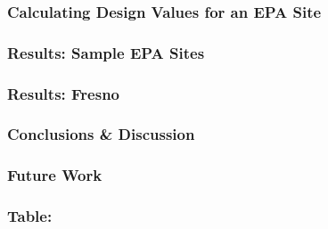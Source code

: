 \documentclass{beamer}
\begin{document}
\begin{frame}
\frametitle{Calculating Design Values for an EPA Site}
\end{frame}


\begin{frame}
\frametitle{Results: Sample EPA Sites}
\end{frame}


\begin{frame}
\frametitle{Results: Fresno}
\end{frame}


\begin{frame}
\frametitle{Conclusions \& Discussion}
\end{frame}


\begin{frame}
\frametitle{Future Work}
\end{frame}


\begin{frame}
\frametitle{Table: }
\end{frame}
\end{document}
